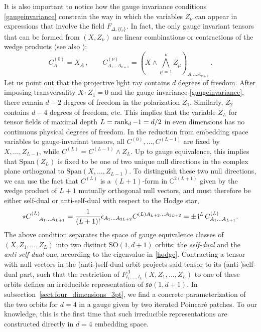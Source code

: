 \documentclass{article}
\def \Cs {\mathbb{C}}
\begin{document}
It is also important to notice how the gauge invariance conditions~
\eqref{gaugeinvariance} constrain the way in which the variables $Z_\nu$ can appear 
in expressions that involve the field $F_{\Delta,\{l_\nu\}}$. In fact, the only gauge invariant 
tensors that can be formed from $(X,Z_{\nu})$ are linear combinations or contractions of the wedge products (see also \cite[eq.~27]{Lauria:2018klo}):
\begin{equation}
    C^{(0)}_A=X_A\,, \qquad C^{(\nu)}_{A_1\dots A_{\nu+1}}=
    \left(X\wedge\bigwedge_{\mu=1}^{\nu}Z_\mu\right)_{A_1\dots A_{\nu+1}}\,.
    \label{buildingblocks}
\end{equation}
Let us point out that the projective light ray contains $d$ degrees of freedom. 
After imposing transversality $X \cdot Z_1 = 0$ and the gauge invariance 
\eqref{gaugeinvariance}, there remain $d-2$ degrees of freedom in the polarization 
$Z_1$. Similarly, $Z_2$ contains $d-4$ degrees of freedom, etc. This implies that the variable $Z_{L}$ for tensor fields of maximal depth 
$L=\rank_d-1=d/2$ in even dimensions has no continuous physical degrees of freedom. 
In the reduction from embedding space variables to gauge-invariant tensors, all $C^{(0)},\dots, C^{(L-1)}$ are fixed by $X,\dots, Z_{L-1}$, while $C^{(L)} = C^{(L-1)} \wedge Z_L$. Up to gauge equivalence, this implies that $\mathrm{Span}(Z_L)$ is fixed to be one of two unique null directions in the complex plane orthogonal to $\mathrm{Span}(X,\dots,Z_{L-1})$. To distinguish these two null directions, we can use the fact that $C^{(L)}$ is a $(L+1)$-form in $\Cs^{2(L+1)}$ given by the wedge product of $L+1$ mutually orthogonal null vectors, and must therefore be either self-dual or anti-self-dual with respect to the Hodge star,
\begin{equation}
    \star \tensor{C}{^{(L)}_{A_1\dots A_{L+1}}} = \frac{1}{(L+1)!} \epsilon_{A_1\dots A_{2L+2}} C^{(L) A_{L+2}\dots A_{2L+2}} = \pm\, \mathrm{i}^{L} \,C^{(L)}_{A_1\dots A_{L+1}}.
    \label{hodge}
\end{equation}
The above condition separates the space of gauge equivalence classes of $(X,Z_1,\dots,Z_L)$ into two distinct $\mathrm{SO}(1,d+1)$ orbits: the \emph{self-dual}  and the \emph{anti-self-dual} one, according to the eigenvalue in \eqref{hodge}. Contracting a tensor with null vectors in the (anti-)self-dual orbit projects said tensor to its (anti-)self-dual part, such that the restriction of $F^{\Delta}_{l_1,\dots,l_L}\left(X,Z_1,\dots,Z_L\right)$ to one of these orbits defines an irreducible representation of $\mathfrak{so}(1,d+1)$. In subsection~\ref{sect:four_dimensions_3pt}, we find a concrete parameterization of the two orbits for $d=4$ in a gauge given by two iterated Poincaré patches. To our knowledge, this is the first time that such irreducible representations are constructed directly in $d=4$ embedding space. 
\end{document}
